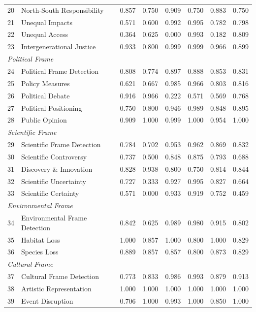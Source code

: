 {\begin{longtable}{p{0.4cm}p{5.5cm}rrrrrr}
20 & North-South Responsibility & 0.857 & 0.750 & 0.909 & 0.750 & 0.883 & 0.750 \\
21 & Unequal Impacts & 0.571 & 0.600 & 0.992 & 0.995 & 0.782 & 0.798 \\
22 & Unequal Access & 0.364 & 0.625 & 0.000 & 0.993 & 0.182 & 0.809 \\
23 & Intergenerational Justice & 0.933 & 0.800 & 0.999 & 0.999 & 0.966 & 0.899 \\
\multicolumn{8}{l}{\textit{Political Frame}} \\
24 & Political Frame Detection & 0.808 & 0.774 & 0.897 & 0.888 & 0.853 & 0.831 \\
25 & Policy Measures & 0.621 & 0.667 & 0.985 & 0.966 & 0.803 & 0.816 \\
26 & Political Debate & 0.916 & 0.966 & 0.222 & 0.571 & 0.569 & 0.768 \\
27 & Political Positioning & 0.750 & 0.800 & 0.946 & 0.989 & 0.848 & 0.895 \\
28 & Public Opinion & 0.909 & 1.000 & 0.999 & 1.000 & 0.954 & 1.000 \\
\multicolumn{8}{l}{\textit{Scientific Frame}} \\
29 & Scientific Frame Detection & 0.784 & 0.702 & 0.953 & 0.962 & 0.869 & 0.832 \\
30 & Scientific Controversy & 0.737 & 0.500 & 0.848 & 0.875 & 0.793 & 0.688 \\
31 & Discovery \& Innovation & 0.828 & 0.938 & 0.800 & 0.750 & 0.814 & 0.844 \\
32 & Scientific Uncertainty & 0.727 & 0.333 & 0.927 & 0.995 & 0.827 & 0.664 \\
33 & Scientific Certainty & 0.571 & 0.000 & 0.933 & 0.919 & 0.752 & 0.459 \\
\multicolumn{8}{l}{\textit{Environmental Frame}} \\
34 & Environmental Frame Detection & 0.842 & 0.625 & 0.989 & 0.980 & 0.915 & 0.802 \\
35 & Habitat Loss & 1.000 & 0.857 & 1.000 & 0.800 & 1.000 & 0.829 \\
36 & Species Loss & 0.889 & 0.857 & 0.857 & 0.800 & 0.873 & 0.829 \\
\multicolumn{8}{l}{\textit{Cultural Frame}} \\
37 & Cultural Frame Detection & 0.773 & 0.833 & 0.986 & 0.993 & 0.879 & 0.913 \\
38 & Artistic Representation & 1.000 & 1.000 & 1.000 & 1.000 & 1.000 & 1.000 \\
39 & Event Disruption & 0.706 & 1.000 & 0.993 & 1.000 & 0.850 & 1.000 \\

\end{longtable}}
